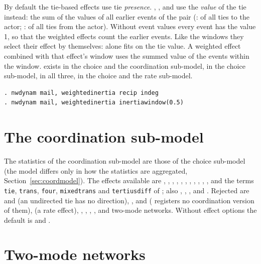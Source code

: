 By default the tie-based effects use tie \emph{presence}. , ,  and  use the \emph{value} of the tie instead: the sum of the values of all earlier events of the pair (: of all ties to the actor; : of all ties from the actor). Without event values every event has the value 1, so that the weighted effects count the earlier events. Like the windows they select their effect by themselves:  alone fits  on the tie value. A weighted effect combined with that effect's window uses the summed value of the events within the window.  exists in the choice and the coordination sub-model,  in the choice sub-model,  in all three,  in the choice and the rate sub-model.
\begin{lstlisting}
. nwdynam mail, weightedinertia recip indeg
. nwdynam mail, weightedinertia inertiawindow(0.5)
\end{lstlisting}

\section{The coordination sub-model}\label{sec:coordeffects}

The statistics of the coordination sub-model are those of the choice sub-model (the model differs only in how the statistics are aggregated, Section~\ref{sec:coordmodel}). The effects available are , , , , , , , , , , ,  and the terms \texttt{tie}, \texttt{trans}, \texttt{four}, \texttt{mixedtrans} and \texttt{tertiusdiff} of ; also , , ,  and . Rejected are  and  (an undirected tie has no direction), ,  and  (\goldfish{} registers no coordination version of them),  (a rate effect), , , , ,  and two-mode networks. Without effect options the default is  and .

\section{Two-mode networks}\label{sec:twomode}

